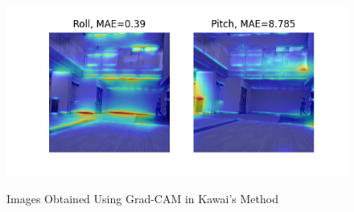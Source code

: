 \documentclass[a4paper, 10pt, conference]{ieeeconf}      %
\begin{document}
\begin{figure}[htpb]
\begin{minipage}[htpb]{1.0\linewidth}
  \end{minipage} \\
  \begin{minipage}[htpb]{1.0\linewidth}
    \centering
    \includegraphics[keepaspectratio, scale=0.55]{./figure/appendix/unknown_env/image_148.png}
    \label{fig:roll_example}
  \end{minipage}
  \caption{Images Obtained Using Grad-CAM in Kawai's Method\cite{9708864}}\label{fig:grad_cam}
\end{figure}
\end{document}
